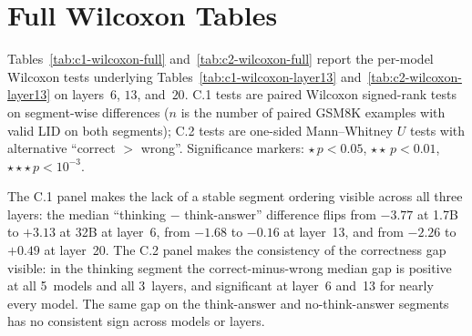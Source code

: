 \documentclass{article}
\theoremstyle{plain}
\theoremstyle{definition}
\theoremstyle{remark}
\begin{document}
\section{Full Wilcoxon Tables}
\label{app:wilcoxon-tables}

Tables~\ref{tab:c1-wilcoxon-full} and~\ref{tab:c2-wilcoxon-full} report the per-model Wilcoxon tests underlying Tables~\ref{tab:c1-wilcoxon-layer13} and~\ref{tab:c2-wilcoxon-layer13} on layers~$6$, $13$, and~$20$. C.1 tests are paired Wilcoxon signed-rank tests on segment-wise differences ($n$ is the number of paired GSM8K examples with valid LID on both segments); C.2 tests are one-sided Mann--Whitney $U$ tests with alternative ``correct $>$ wrong''. Significance markers: $\star\,p\!<\!0.05$, $\star\star\,p\!<\!0.01$, $\star\star\star\,p\!<\!10^{-3}$.

The C.1 panel makes the lack of a stable segment ordering visible across all three layers: the median ``thinking $-$ think-answer'' difference flips from $-3.77$ at 1.7B to $+3.13$ at 32B at layer~6, from $-1.68$ to $-0.16$ at layer~13, and from $-2.26$ to $+0.49$ at layer~20. The C.2 panel makes the consistency of the correctness gap visible: in the thinking segment the correct-minus-wrong median gap is positive at all 5~models and all 3~layers, and significant at layer~6 and~13 for nearly every model. The same gap on the think-answer and no-think-answer segments has no consistent sign across models or layers.
\end{document}
